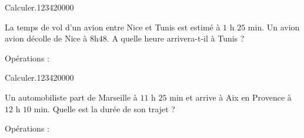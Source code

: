 \begin{pageAuto}
\begin{ExoAuto}{ Calculer.}{1234}{2}{0}{0}{0}{0}
\begin{minipage}{0.68\linewidth}
La temps de vol d'un avion entre Nice et Tunis est estimé à $1$ h $25$ min. 
Un avion avion décolle de Nice à $8$h$48$. A quelle heure arrivera-t-il à Tunis ?  
 
\end{minipage}
\hfill \vrule \hfill 
\begin{minipage}{0.30\linewidth}Opérations :
\vspace{3cm}
\end{minipage}

\end{ExoAuto}
\begin{ExoAuto}{ Calculer.}{1234}{2}{0}{0}{0}{0}


\begin{minipage}{0.68\linewidth}

Un automobiliste part de Marseille à $11$ h $25$ min et arrive à Aix en Provence à $12$ h $10$ min.
Quelle est la durée de son trajet ? 
 
\end{minipage}
\hfill \vrule \hfill 
\begin{minipage}{0.30\linewidth}Opérations :
\vspace{3cm}
\end{minipage}
\end{ExoAuto}
 
\end{pageAuto}


\begin{pageBrouillon} 
 

\end{pageBrouillon}

